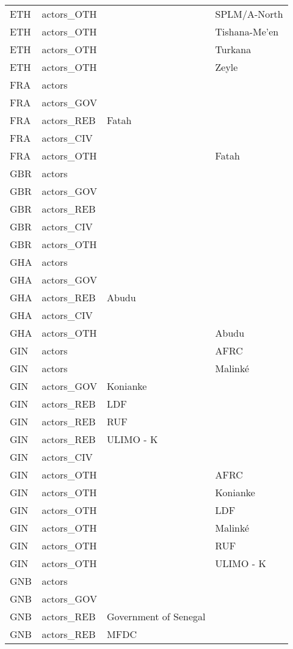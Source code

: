 \begin{table}[ht]
\begin{tabular}{llll}
  ETH & actors\_OTH &  & SPLM/A-North \\ 
  ETH & actors\_OTH &  & Tishana-Me’en \\ 
  ETH & actors\_OTH &  & Turkana \\ 
  ETH & actors\_OTH &  & Zeyle \\ 
  FRA & actors &  &  \\ 
  FRA & actors\_GOV &  &  \\ 
  FRA & actors\_REB & Fatah &  \\ 
  FRA & actors\_CIV &  &  \\ 
  FRA & actors\_OTH &  & Fatah \\ 
  GBR & actors &  &  \\ 
  GBR & actors\_GOV &  &  \\ 
  GBR & actors\_REB &  &  \\ 
  GBR & actors\_CIV &  &  \\ 
  GBR & actors\_OTH &  &  \\ 
  GHA & actors &  &  \\ 
  GHA & actors\_GOV &  &  \\ 
  GHA & actors\_REB & Abudu &  \\ 
  GHA & actors\_CIV &  &  \\ 
  GHA & actors\_OTH &  & Abudu \\ 
  GIN & actors &  & AFRC \\ 
  GIN & actors &  & Malinké \\ 
  GIN & actors\_GOV & Konianke &  \\ 
  GIN & actors\_REB & LDF &  \\ 
  GIN & actors\_REB & RUF &  \\ 
  GIN & actors\_REB & ULIMO - K &  \\ 
  GIN & actors\_CIV &  &  \\ 
  GIN & actors\_OTH &  & AFRC \\ 
  GIN & actors\_OTH &  & Konianke \\ 
  GIN & actors\_OTH &  & LDF \\ 
  GIN & actors\_OTH &  & Malinké \\ 
  GIN & actors\_OTH &  & RUF \\ 
  GIN & actors\_OTH &  & ULIMO - K \\ 
  GNB & actors &  &  \\ 
  GNB & actors\_GOV &  &  \\ 
  GNB & actors\_REB & Government of Senegal &  \\ 
  GNB & actors\_REB & MFDC &  \\ 

\end{tabular}
\end{table}
